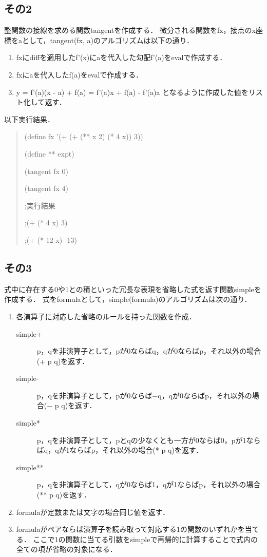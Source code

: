 \subsection{その2}
整関数の接線を求める関数tangentを作成する．
微分される関数をfx，接点のx座標をaとして，tangent(fx, a)のアルゴリズムは以下の通り．

\begin{enumerate}
\item fxにdiffを適用したf'(x)にaを代入した勾配f'(a)をevalで作成する．
\item fxにaを代入したf(a)をevalで作成する．
\item y = f'(a)(x - a) + f(a) = f'(a)x + f(a) - f'(a)a となるように作成した値をリスト化して返す．
\end{enumerate}

以下実行結果．


\begin{quote}
  
  (define fx '(+ (+ (** x 2) (* 4 x)) 3))
  
  (define ** expt)
  
  (tangent fx 0)
  
  (tangent fx 4)
  
  ;実行結果
  
  ;(+ (* 4 x) 3)
  
  ;(+ (* 12 x) -13)

\end{quote}

\subsection{その3}
式中に存在する0や1との積といった冗長な表現を省略した式を返す関数simpleを作成する．
式をformulaとして，simple(formula)のアルゴリズムは次の通り．

\begin{enumerate}
\item 各演算子に対応した省略のルールを持った関数を作成．
  \begin{description}
  \item [simple+]p，qを非演算子として，pが0ならばq，qが0ならばp，それ以外の場合(+ p q)を返す．
  \item [simple-]p，qを非演算子として，pが0ならば−q，qが0ならばp，それ以外の場合(− p q)を返す．
  \item [simple*]p，qを非演算子として，pとqの少なくとも一方が0ならば0，pが1ならばq，qが1ならばp，それ以外の場合(* p q)を返す．
  \item [simple**]p，qを非演算子として，qが0ならば1，qが1ならばp，それ以外の場合(** p q)を返す．
  \end{description}
\item formulaが定数または文字の場合同じ値を返す．
\item formulaがペアならば演算子を読み取って対応する1の関数のいずれかを当てる．
  ここで1の関数に当てる引数をsimpleで再帰的に計算することで式内の全ての項が省略の対象になる．
\end{enumerate}


